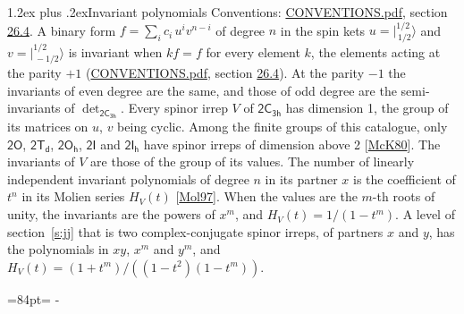 \documentclass[10pt,a4paper]{article}
\makeatletter
\renewcommand\section{\@startsection{section}{1}{\z@}{-3ex plus -1ex minus -.2ex}%
  {1.2ex plus .2ex}{\normalfont\large\sffamily\bfseries\color{parttitle}}}
\newcommand{\needspace}[1]{\par\penalty-100\begingroup\dimen0=#1\relax\dimen2=\pagegoal
  \advance\dimen2-\pagetotal\ifdim\dimen0>\dimen2\relax\ifdim\dimen2>0pt\vfil\break\fi\fi
  \endgroup}
\numberwithin{equation}{section}
\newcommand{\grp}[1]{\mathsf{#1}}
\newcommand{\jm}[2]{\bigl\lvert{}^{#1}_{\,#2}\bigr\rangle}
\makeatother
\begin{document}
\section{Invariant polynomials}\label{s:invariants}
Conventions: \href{../../CONVENTIONS.pdf}{CONVENTIONS.pdf}, section \href{../../CONVENTIONS.pdf\#conv.26.4}{26.4}.
\leavevmode\label{n:local.binary.form}A binary form $f = \sum_i c_i\, u^i v^{n-i}$ of degree $n$ in the spin kets $u = \jm{1/2}{1/2}$ and $v = \jm{1/2}{-1/2}$ is invariant when $k f = f$ for every element $k$, the elements acting at the parity $+1$ (\href{../../CONVENTIONS.pdf}{CONVENTIONS.pdf}, section \href{../../CONVENTIONS.pdf\#conv.26.4}{26.4}). At the parity $-1$ the invariants of even degree are the same, and those of odd degree are the semi-invariants of $\det_{\grp{2C_{3h}}}$.
\leavevmode\label{n:function.hilbert}Every spinor irrep $V$ of $\grp{2C_{3h}}$ has dimension 1, the group of its matrices on $u$, $v$ being cyclic. Among the finite groups of this catalogue, only $\grp{2O}$, $\grp{2T_{d}}$, $\grp{2O_{h}}$, $\grp{2I}$ and $\grp{2I_{h}}$ have spinor irreps of dimension above 2 [\href{../../../REFERENCES.pdf\#ref.McK80}{McK80}]. The invariants of $V$ are those of the group of its values. \label{n:local.partner.x}The number of linearly independent invariant polynomials of degree $n$ in its partner $x$ is the coefficient of $t^n$ in its Molien series $H_V(t)$ [\href{../../../REFERENCES.pdf\#ref.Mol97}{Mol97}]. When the values are the $m$-th roots of unity, the invariants are the powers of $x^{m}$, and $H_V(t) = 1/(1 - t^{m})$. A level of section~\ref{s:jj} that is two complex-conjugate spinor irreps, of partners $x$ and $y$, has the polynomials in $xy$, $x^{m}$ and $y^{m}$, and $H_V(t) = (1 + t^{m})/((1 - t^{2})(1 - t^{m}))$.
\needspace{84pt}
\end{document}
